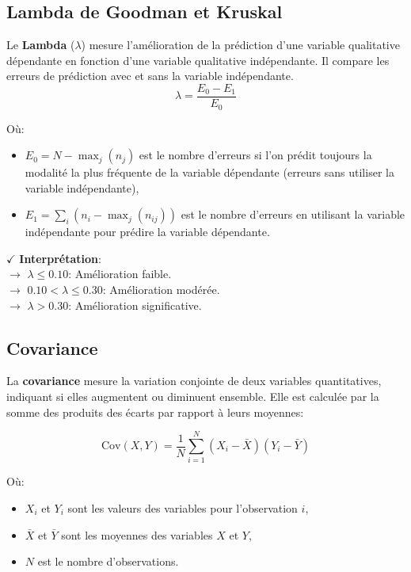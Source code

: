 \subsection{Lambda de Goodman et Kruskal}

Le \textbf{Lambda} (\(\lambda\)) mesure l'amélioration de la prédiction d'une variable qualitative dépendante en fonction d'une variable qualitative indépendante. Il compare les erreurs de prédiction avec et sans la variable indépendante.
\[
\lambda = \frac{E_0 - E_1}{E_0}
\]

Où:
\begin{itemize}
    \item \(E_0 = N - \max_j(n_j)\) est le nombre d'erreurs si l'on prédit toujours la modalité la plus fréquente de la variable dépendante (erreurs sans utiliser la variable indépendante),
    \item \(E_1 = \sum_{i} \left( n_i - \max_j \left( n_{ij} \right) \right)\) est le nombre d'erreurs en utilisant la variable indépendante pour prédire la variable dépendante.
\end{itemize}

\textbf{\(\checkmark\)} \textbf{Interprétation}:\\
\noindent \textbf{\(\rightarrow\)} \( \lambda \leq 0.10 \): Amélioration faible.\\
\textbf{\(\rightarrow\)}  \( 0.10 < \lambda \leq 0.30 \): Amélioration modérée.\\
\textbf{\(\rightarrow\)}  \( \lambda > 0.30 \): Amélioration significative.

\subsection{Covariance}

La \textbf{covariance} mesure la variation conjointe de deux variables quantitatives, indiquant si elles augmentent ou diminuent ensemble. Elle est calculée par la somme des produits des écarts par rapport à leurs moyennes:

\[
\text{Cov}(X, Y) = \frac{1}{N} \sum_{i=1}^{N} (X_i - \bar{X})(Y_i - \bar{Y})
\]

Où:
\begin{itemize}
    \item \(X_i\) et \(Y_i\) sont les valeurs des variables pour l’observation \(i\),
    \item \(\bar{X}\) et \(\bar{Y}\) sont les moyennes des variables \(X\) et \(Y\),
    \item \(N\) est le nombre d'observations.
\end{itemize}


